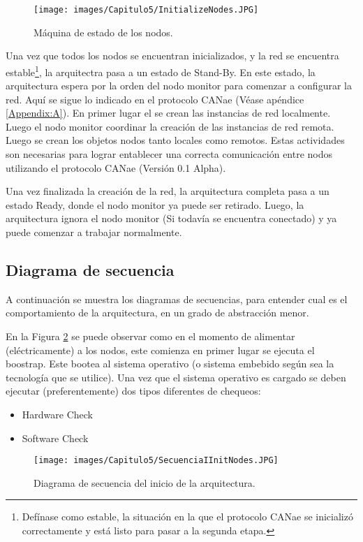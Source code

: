 \begin{figure}[h!]
 \centering
 \texttt{[image: images/Capitulo5/InitializeNodes.JPG]}
  \caption{Máquina de estado de los nodos.}
\label{fig:StateMacineInitNodes}
\end{figure}

Una vez que todos los nodos se encuentran inicializados, y la red se encuentra
estable\footnote{Defínase como estable, la situación en la que el
  protocolo CANae se inicializó correctamente y está listo para pasar
  a la segunda etapa.}, la arquitectra pasa a un estado de Stand-By.
En este estado, la arquitectura espera por la orden del nodo monitor
para comenzar a configurar la red. Aquí se sigue lo indicado en el
protocolo CANae (Véase apéndice \ref{Appendix:A}). En primer lugar
el se crean las instancias de red localmente. Luego el nodo monitor
coordinar la creación de las instancias de red remota. Luego se crean
los objetos nodos tanto locales como remotos. Estas actividades
son necesarias para lograr entablecer una correcta comunicación
entre nodos utilizando el protocolo CANae (Versión 0.1 Alpha).

Una vez finalizada la creación de la red, la arquitectura completa
pasa a un estado Ready, donde el nodo monitor ya puede ser retirado.
Luego, la arquitectura ignora el nodo monitor (Si todavía se encuentra
conectado) y ya puede comenzar a trabajar normalmente.

\subsection{Diagrama de secuencia}
A continuación se muestra los diagramas de secuencias, para entender
cual es el comportamiento de la arquitectura, en un grado
de abstracción menor.

En la Figura \ref{fig:SecInitArq} se puede observar como en
el momento de alimentar (eléctricamente) a los nodos, este comienza
en primer lugar se ejecuta el boostrap. Este bootea al
sistema operativo (o sistema embebido según sea la tecnología
que se utilice). Una vez que el sistema operativo es cargado se
deben ejecutar (preferentemente) dos tipos diferentes de chequeos:
\begin{itemize}
\item Hardware Check
\item Software Check
\end{itemize}

\begin{figure}[h!]
 \centering
 \texttt{[image: images/Capitulo5/SecuenciaIInitNodes.JPG]}
  \caption{Diagrama de secuencia del inicio de la arquitectura.}
\label{fig:SecInitArq}
\end{figure}

